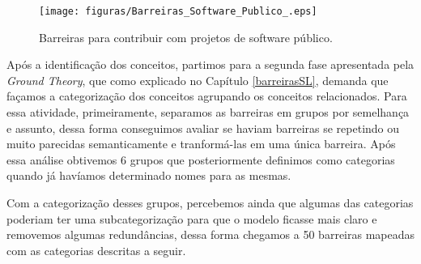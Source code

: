 \begin{figure}[h]
	\centering
	\label{fig:SPbarreiras}
		\texttt{[image: figuras/Barreiras\_Software\_Publico\_.eps]}
	\caption{Barreiras para contribuir com projetos de software público.}
\end{figure}

Após a identificação dos conceitos, partimos para a segunda fase apresentada pela
\textit{Ground Theory}, que como explicado no Capítulo \ref{barreirasSL}, demanda que  
façamos a categorização dos conceitos agrupando os conceitos relacionados. Para essa 
atividade, primeiramente, separamos as barreiras em grupos por semelhança e assunto,
dessa forma conseguimos avaliar se haviam barreiras se repetindo ou muito parecidas
semanticamente e tranformá-las em uma única barreira. Após essa análise obtivemos 6 
grupos que posteriormente definimos como categorias quando já havíamos determinado
nomes para as mesmas.
 
Com a categorização desses grupos, percebemos ainda que algumas das categorias
poderiam ter uma subcategorização para que o modelo ficasse mais claro e removemos
algumas redundâncias, dessa forma chegamos a 50 barreiras mapeadas com as categorias
descritas a seguir.

